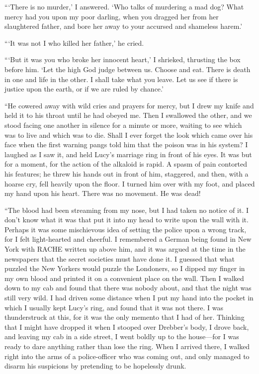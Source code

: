 \documentclass[12pt]{book}
\begin{document}
“‘There is no murder,’ I answered. ‘Who talks of murdering a mad dog? What mercy had you upon my poor darling, when you dragged her from her slaughtered father, and bore her away to your accursed and shameless harem.’ 

“‘It was not I who killed her father,’ he cried. 

“‘But it was you who broke her innocent heart,’ I shrieked, thrusting the box before him. ‘Let the high God judge between us. Choose and eat. There is death in one and life in the other. I shall take what you leave. Let us see if there is justice upon the earth, or if we are ruled by chance.’ 

“He cowered away with wild cries and prayers for mercy, but I drew my knife and held it to his throat until he had obeyed me. Then I swallowed the other, and we stood facing one another in silence for a minute or more, waiting to see which was to live and which was to die. Shall I ever forget the look which came over his face when the first warning pangs told him that the poison was in his system? I laughed as I saw it, and held Lucy’s marriage ring in front of his eyes. It was but for a moment, for the action of the alkaloid is rapid. A spasm of pain contorted his features; he threw his hands out in front of him, staggered, and then, with a hoarse cry, fell heavily upon the floor. I turned him over with my foot, and placed my hand upon his heart. There was no movement. He was dead! 

“The blood had been streaming from my nose, but I had taken no notice of it. I don’t know what it was that put it into my head to write upon the wall with it. Perhaps it was some mischievous idea of setting the police upon a wrong track, for I felt light-hearted and cheerful. I remembered a German being found in New York with RACHE written up above him, and it was argued at the time in the newspapers that the secret societies must have done it. I guessed that what puzzled the New Yorkers would puzzle the Londoners, so I dipped my finger in my own blood and printed it on a convenient place on the wall. Then I walked down to my cab and found that there was nobody about, and that the night was still very wild. I had driven some distance when I put my hand into the pocket in which I usually kept Lucy’s ring, and found that it was not there. I was thunderstruck at this, for it was the only memento that I had of her. Thinking that I might have dropped it when I stooped over Drebber’s body, I drove back, and leaving my cab in a side street, I went boldly up to the house—for I was ready to dare anything rather than lose the ring. When I arrived there, I walked right into the arms of a police-officer who was coming out, and only managed to disarm his suspicions by pretending to be hopelessly drunk. 
\end{document}
